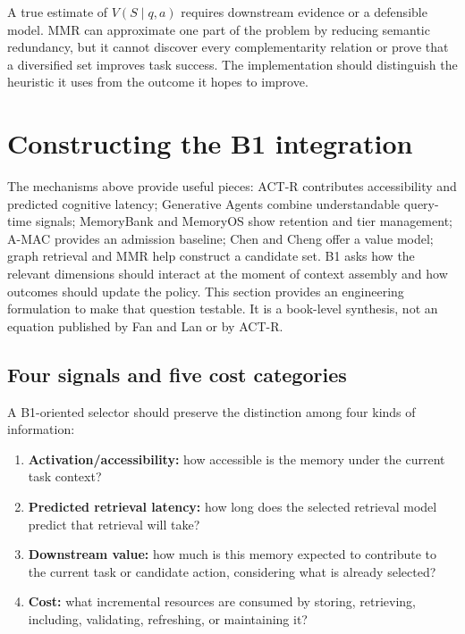 A true estimate of \(V(S\mid q,a)\) requires downstream evidence or a defensible model. MMR can approximate one part of the problem by reducing semantic redundancy, but it cannot discover every complementarity relation or prove that a diversified set improves task success. The implementation should distinguish the heuristic it uses from the outcome it hopes to improve.

\section{Constructing the B1 integration}
\label{sec:ch12-b1-integration}

The mechanisms above provide useful pieces: ACT-R contributes accessibility and predicted cognitive latency; Generative Agents combine understandable query-time signals; MemoryBank and MemoryOS show retention and tier management; A-MAC provides an admission baseline; Chen and Cheng offer a value model; graph retrieval and MMR help construct a candidate set. B1 asks how the relevant dimensions should interact at the moment of context assembly and how outcomes should update the policy. This section provides an engineering formulation to make that question testable. It is a book-level synthesis, not an equation published by Fan and Lan or by ACT-R.

\subsection{Four signals and five cost categories}
\label{subsec:ch12-four-signals-costs}

A B1-oriented selector should preserve the distinction among four kinds of information:
\begin{enumerate}
  \item \textbf{Activation/accessibility:} how accessible is the memory under the current task context?
  \item \textbf{Predicted retrieval latency:} how long does the selected retrieval model predict that retrieval will take?
  \item \textbf{Downstream value:} how much is this memory expected to contribute to the current task or candidate action, considering what is already selected?
  \item \textbf{Cost:} what incremental resources are consumed by storing, retrieving, including, validating, refreshing, or maintaining it?
\end{enumerate}

